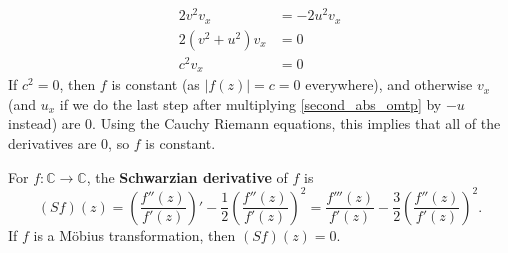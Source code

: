 \documentclass{homework}
\begin{document}
\begin{solution}
\begin{align*}
                                                                                                                               2v^2v_x &= -2u^2v_x\\
                                                                                                                               2(v^2 +u^2) v_x &= 0\\
                                                                                                                               c^2v_x &= 0
                                                                                                                               \end{align*}
                                                                                                                               If $c^2=0$, then $f$ is constant (as $|f(z)|=c=0$ everywhere), and otherwise $v_x$ (and $u_x$ if we do the last step after multiplying \ref{second_abs_omtp} by $-u$ instead) are 0. Using the Cauchy Riemann equations, this implies that all of the derivatives are 0, so $f$ is constant.
                                                                                                                               \end{solution}
                                                                                                                               \begin{problem}\label{schwarzian-derivative}For $f : \mathbb{C} \to \mathbb{C}$, the \textbf{Schwarzian derivative} of $f$ is
                                                                                                                                 \[ (Sf)(z)=\left({\frac{f''(z)}{f'(z)}}\right)'-{\frac12}\left(\frac{f''(z)}{f'(z)}\right)^2={\frac {f'''(z)}{f'(z)}}-{\frac32}\left(\frac{f''(z)}{f'(z)}\right)^2. \]
                                                                                                                                   If $f$ is a M\"obius transformation, then $(Sf)(z) = 0$.
                                                                                                                                   \end{problem}
\end{document}
